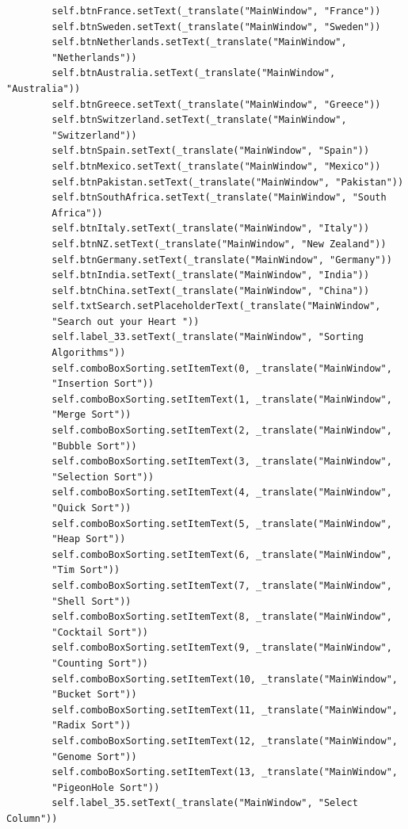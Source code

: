 \documentclass[12pt]{article}
\begin{document}
\begin{verbatim}
        self.btnFrance.setText(_translate("MainWindow", "France"))
        self.btnSweden.setText(_translate("MainWindow", "Sweden"))
        self.btnNetherlands.setText(_translate("MainWindow",
        "Netherlands"))
        self.btnAustralia.setText(_translate("MainWindow", "Australia"))
        self.btnGreece.setText(_translate("MainWindow", "Greece"))
        self.btnSwitzerland.setText(_translate("MainWindow",
        "Switzerland"))
        self.btnSpain.setText(_translate("MainWindow", "Spain"))
        self.btnMexico.setText(_translate("MainWindow", "Mexico"))
        self.btnPakistan.setText(_translate("MainWindow", "Pakistan"))
        self.btnSouthAfrica.setText(_translate("MainWindow", "South
        Africa"))
        self.btnItaly.setText(_translate("MainWindow", "Italy"))
        self.btnNZ.setText(_translate("MainWindow", "New Zealand"))
        self.btnGermany.setText(_translate("MainWindow", "Germany"))
        self.btnIndia.setText(_translate("MainWindow", "India"))
        self.btnChina.setText(_translate("MainWindow", "China"))
        self.txtSearch.setPlaceholderText(_translate("MainWindow",
        "Search out your Heart "))
        self.label_33.setText(_translate("MainWindow", "Sorting
        Algorithms"))
        self.comboBoxSorting.setItemText(0, _translate("MainWindow",
        "Insertion Sort"))
        self.comboBoxSorting.setItemText(1, _translate("MainWindow",
        "Merge Sort"))
        self.comboBoxSorting.setItemText(2, _translate("MainWindow",
        "Bubble Sort"))
        self.comboBoxSorting.setItemText(3, _translate("MainWindow",
        "Selection Sort"))
        self.comboBoxSorting.setItemText(4, _translate("MainWindow",
        "Quick Sort"))
        self.comboBoxSorting.setItemText(5, _translate("MainWindow",
        "Heap Sort"))
        self.comboBoxSorting.setItemText(6, _translate("MainWindow",
        "Tim Sort"))
        self.comboBoxSorting.setItemText(7, _translate("MainWindow",
        "Shell Sort"))
        self.comboBoxSorting.setItemText(8, _translate("MainWindow",
        "Cocktail Sort"))
        self.comboBoxSorting.setItemText(9, _translate("MainWindow",
        "Counting Sort"))
        self.comboBoxSorting.setItemText(10, _translate("MainWindow",
        "Bucket Sort"))
        self.comboBoxSorting.setItemText(11, _translate("MainWindow",
        "Radix Sort"))
        self.comboBoxSorting.setItemText(12, _translate("MainWindow",
        "Genome Sort"))
        self.comboBoxSorting.setItemText(13, _translate("MainWindow",
        "PigeonHole Sort"))
        self.label_35.setText(_translate("MainWindow", "Select Column"))

\end{verbatim}
\end{document}
